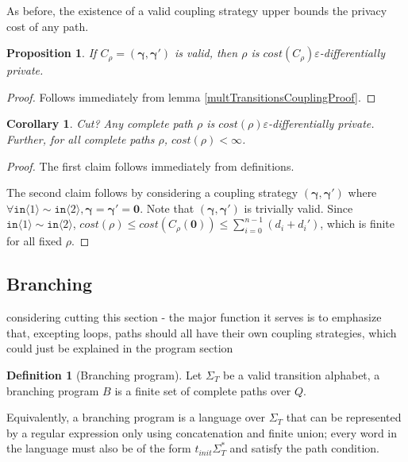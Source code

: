 \documentclass[12pt]{article}
\newcommand{\brangle}[1]{\langle #1 \rangle}
\newtheorem{prop}[thm]{Proposition}
\newtheorem{cor}[thm]{Corollary}
\theoremstyle{definition}
\newtheorem{defn}[thm]{Definition}
\begin{document}
As before, the existence of a valid coupling strategy upper bounds the privacy cost of any path. 

\begin{prop}
    If $C_\rho=(\bm{\gamma}, \bm{\gamma}')$ is valid, then $\rho$ is $cost(C_\rho)\varepsilon$-differentially private.
\end{prop}

\begin{proof}
    Follows immediately from lemma \ref{multTransitionsCouplingProof}.
\end{proof}

\begin{cor}{\color{red} Cut?}
    Any complete path $\rho$ is $cost(\rho)\varepsilon$-differentially private. Further, for all complete paths $\rho$, $cost(\rho)<\infty$. 
\end{cor}

\begin{proof}
    The first claim follows immediately from definitions. 
    
    The second claim follows by considering a coupling strategy $(\bm{\gamma}, \bm{\gamma}')$ where $\forall \texttt{in}\brangle{1}\sim\texttt{in}\brangle{2}, \bm{\gamma} = \bm{\gamma}' = \bm{0}$. Note that $(\bm{\gamma}, \bm{\gamma}')$ is trivially valid. Since $\texttt{in}\brangle{1}\sim\texttt{in}\brangle{2}$, $cost(\rho)\leq cost(C_\rho(\bm{0}))\leq \sum_{i=0}^{n-1}(d_i+d_i')$, which is finite for all fixed $\rho$. 
\end{proof}


 

\subsection{Branching} 
{\color{red} considering cutting this section - the major function it serves is to emphasize that, excepting loops, paths should all have their own coupling strategies, which could just be explained in the program section}


\begin{defn}[Branching program]
    Let $\Sigma_T$ be a valid transition alphabet, a branching program $B$ is a finite set of complete paths over $Q$.
\end{defn}

Equivalently, a branching program is a language over $\Sigma_T$ that can be represented by a regular expression only using concatenation and finite union; every word in the language must also be of the form $t_{init}\Sigma_T^*$ and satisfy the path condition. 
\end{document}
